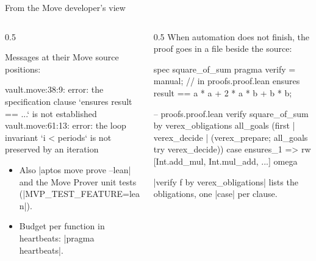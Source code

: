 \documentclass[aspectratio=169,11pt]{beamer}
\begin{document}
\begin{frame}[fragile]{From the Move developer's view}
  \begin{columns}[T]
    \begin{column}{0.5\textwidth}
{\scriptsize Messages at their Move source positions:}
\begin{ShellSmall}
vault.move:38:9: error: the specification
  clause `ensures result == ...` is not
  established
vault.move:61:13: error: the loop invariant
  `i < periods` is not preserved by an
  iteration
\end{ShellSmall}
      \begin{itemize}\small
        \item Also |aptos move prove --lean| and the Move Prover unit tests (|MVP_TEST_FEATURE=lean|).
        \item Budget per function in heartbeats: |pragma heartbeats|.
      \end{itemize}
    \end{column}
    \begin{column}{0.5\textwidth}
      When automation does not finish, the proof goes in a file beside the source:
\begin{MoveSmall}
spec square_of_sum {
  pragma verify = manual; // in proofs.proof.lean
  ensures result == a * a + 2 * a * b + b * b;
}
\end{MoveSmall}
\begin{LeanSmall}
-- proofs.proof.lean
verify square_of_sum by
  verex_obligations
  all_goals (first | verex_decide
    | (verex_prepare; all_goals try verex_decide))
  case ensures_1 =>
    rw [Int.add_mul, Int.mul_add, ...]
    omega
\end{LeanSmall}
      {\scriptsize |verify f by verex_obligations| lists the obligations, one |case| per clause.}
    \end{column}
  \end{columns}
\end{frame}
\end{document}
